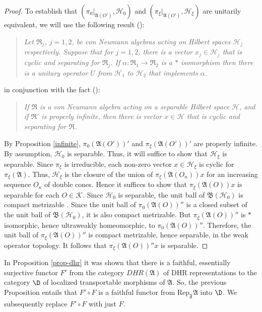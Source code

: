 \documentclass[12pt]{article}
\newcommand{\alg}[1]{\mathfrak{#1}}
\theoremstyle{definition}
\theoremstyle{definition}
\theoremstyle{remark}
\def\2#1{{\mathcal #1}}
\def\al#1{{\mathfrak #1}}
\def\a{\alpha} \def\b{\beta} \def\g{\gamma} \def\d{\delta}
\newcommand{\Rep}{\mathrm{Rep}}
\begin{document}
\begin{proof}
To establish that $(\pi _{0}|_{\alg{A}(O')},\2H_0)$ and $(\pi
_{\xi}|_{\alg{A}(O')},\2H_{\xi})$ are unitarily equivalent, we will
use the following result (\cite[Theorem 7.2.9]{kr}):
\begin{quote}
  \textit{Let $\alg{R}_j$, $j=1,2$, be von Neumann
    algebras acting on Hilbert spaces $\2H _j$
    respectively.  Suppose that for $j=1,2$, there is a
    vector $x_j\in \2H _j$ that is cyclic and
    separating for $\alg{R}_j$.  If $\a :\alg{R}_1\to
    \alg{R}_2$ is a $*$ isomorphism then there is a
    unitary operator $U$ from $\2H _1$ to $\2H _2$ that
    implements $\a$.}
\end{quote}
in conjunction with the fact (\cite[Exercise 9.6.32]{kr}):
\begin{quote}
  \textit{If $\alg{R}$ is a von Neumann algebra acting on a separable Hilbert space
    $\2H$, and if $\alg{R}'$ is properly infinite, then there is vector $x\in \2H$
    that is cyclic and separating for $\alg{R}$.}
\end{quote}
By Proposition \ref{infinite}, $\pi _0 (\alg{A}(O'))'$ and $\pi
_{\xi}(\alg{A}(O'))'$ are properly infinite.  By assumption, $\2H _0$
is separable.  Thus, it will suffice to show that $\2H _{\xi}$ is
separable.  Since $\pi _{\xi}$ is irreducible, each non-zero vector
$x\in \2H _{\xi}$ is cyclic for $\pi _{\xi}(\alg{A})$.  Thus, $\2H
_{\xi}$ is the closure of the union of $\pi _{\xi}(\alg{A}(O_n))x$ for
an increasing sequence $O_n$ of double cones.  Hence it suffices to
show that $\pi _{\xi}(\alg{A}(O))x$ is separable for each $O\in \2K$.
Since $\2H _0$ is separable, the unit ball of $\alg{B}(\2H _0)$ is
compact metrizable \cite[Thm.\ 5.1.3; Exercise 5.7.7]{kr}.  Since the
unit ball of $\pi _0(\alg{A}(O))''$ is a closed subset of the unit
ball of $\alg{B}(\2H _0)$, it is also compact metrizable.  But $\pi
_{\xi}(\alg{A}(O))''$ is $*$ isomorphic, hence ultraweakly
homeomorphic, to $\pi _{0}(\alg{A}(O))''$.  Therefore, the unit ball
of $\pi _{\xi}(\alg{A}(O))''$ is compact metrizable, hence separable,
in the weak operator topology.  It follows that $\pi
_{\xi}(\alg{A}(O))''x$ is separable.
\end{proof}

In Proposition \ref{prop-dhr} it was shown that there is a faithful,
essentially surjective functor $F'$ from the category $DHR(\al A)$ of
DHR representations to the category $\D$ of localized transportable
morphisms of $\al A$.  So, the previous Proposition entails that
$F'\circ F$ is a faithful functor from $\Rep _{\al F}\al A$ into $\D$.
We subsequently replace $F'\circ F$ with just $F$.
\end{document}
